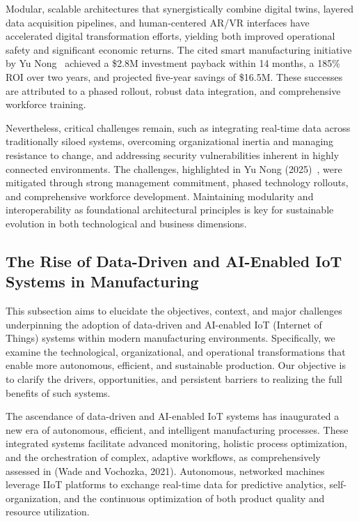 \documentclass[sigconf]{acmart}
\begin{document}
Modular, scalable architectures that synergistically combine digital twins, layered data acquisition pipelines, and human-centered AR/VR interfaces have accelerated digital transformation efforts, yielding both improved operational safety and significant economic returns. The cited smart manufacturing initiative by Yu Nong~\cite{ref23} achieved a \$2.8M investment payback within 14 months, a 185\% ROI over two years, and projected five-year savings of \$16.5M. These successes are attributed to a phased rollout, robust data integration, and comprehensive workforce training.

Nevertheless, critical challenges remain, such as integrating real-time data across traditionally siloed systems, overcoming organizational inertia and managing resistance to change, and addressing security vulnerabilities inherent in highly connected environments. The challenges, highlighted in Yu Nong (2025)~\cite{ref23}, were mitigated through strong management commitment, phased technology rollouts, and comprehensive workforce development. Maintaining modularity and interoperability as foundational architectural principles is key for sustainable evolution in both technological and business dimensions.

\subsection{The Rise of Data-Driven and AI-Enabled IoT Systems in Manufacturing}

This subsection aims to elucidate the objectives, context, and major challenges underpinning the adoption of data-driven and AI-enabled IoT (Internet of Things) systems within modern manufacturing environments. Specifically, we examine the technological, organizational, and operational transformations that enable more autonomous, efficient, and sustainable production. Our objective is to clarify the drivers, opportunities, and persistent barriers to realizing the full benefits of such systems.

The ascendance of data-driven and AI-enabled IoT systems has inaugurated a new era of autonomous, efficient, and intelligent manufacturing processes. These integrated systems facilitate advanced monitoring, holistic process optimization, and the orchestration of complex, adaptive workflows, as comprehensively assessed in \cite{ref31} (Wade and Vochozka, 2021). Autonomous, networked machines leverage IIoT platforms to exchange real-time data for predictive analytics, self-organization, and the continuous optimization of both product quality and resource utilization.
\end{document}

